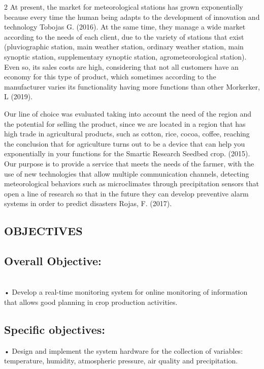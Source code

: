 \documentclass{article}
\begin{document}
\begin{multicols} {2}
At present, the market for meteorological stations has grown exponentially because every time the human being adapts to the development of innovation and technology Tobojas G. (2016). At the same time, they manage a wide market according to the needs of each client, due to the variety of stations that exist (pluviographic station, main weather station, ordinary weather station, main synoptic station, supplementary synoptic station, agrometeorological station). Even so, its sales costs are high, considering that not all customers have an economy for this type of product, which sometimes according to the manufacturer varies its functionality having more functions than other Morkerker, L (2019).

Our line of choice was evaluated taking into account the need of the region and the potential for selling the product, since we are located in a region that has high trade in agricultural products, such as cotton, rice, cocoa, coffee, reaching the conclusion that for agriculture turns out to be a device that can help you exponentially in your functions for the Smartic Research Seedbed crop. (2015).
 
Our purpose is to provide a service that meets the needs of the farmer, with the use of new technologies that allow multiple communication channels, detecting meteorological behaviors such as microclimates through precipitation sensors that open a line of research so that in the future they can develop preventive alarm systems in order to predict disasters Rojas, F. (2017).

\begin{center}
\section{OBJECTIVES}
\end{center}
\subsection{Overall Objective:}
\\
• Develop a real-time monitoring system for online monitoring of information that allows good planning in crop production activities.
\subsection{Specific objectives:}
• Design and implement the system hardware for the collection of variables: temperature, humidity, atmospheric pressure, air quality and precipitation.


\end{multicols}
\end{document}
